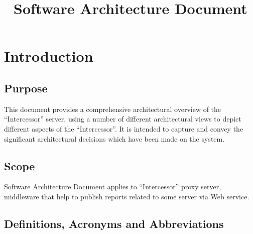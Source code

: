 \documentclass[a4paper,twoside]{article}
\title{Software Architecture Document}
\newcommand{\Inter}{{\fontseries{b}\selectfont ``Intercessor''}}
\begin{document}
\maketitle


\tableofcontents

\section{Introduction}


\subsection{Purpose}

This document provides a comprehensive architectural overview of the \Inter{} server, using a
number of different architectural views to depict different aspects of the
\Inter{}. It is intended to capture and
convey the significant architectural decisions which have been made on the
system.

\subsection{Scope}

Software Architecture Document applies to \Inter{} proxy server,
middleware that help
to publish reports related to some server via Web service.

\subsection{Definitions, Acronyms and Abbreviations}
\end{document}

